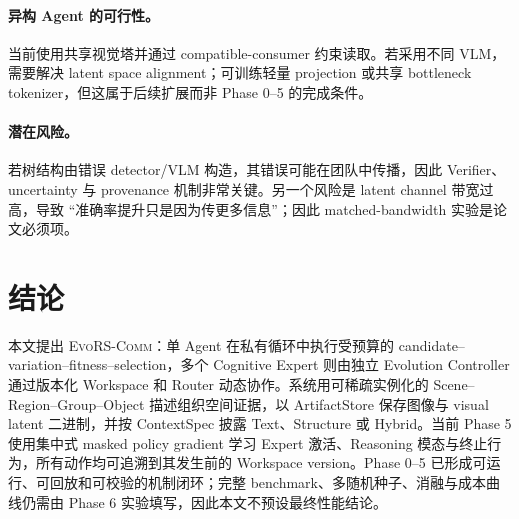 \documentclass[10pt,a4paper,twocolumn]{ctexart}
\newcommand{\ours}{\textsc{EvoRS-Comm}}
\begin{document}
\paragraph{异构 Agent 的可行性。}
当前使用共享视觉塔并通过 compatible-consumer 约束读取。若采用不同 VLM，需要解决 latent space alignment；可训练轻量 projection 或共享 bottleneck tokenizer，但这属于后续扩展而非 Phase 0--5 的完成条件。

\paragraph{潜在风险。}
若树结构由错误 detector/VLM 构造，其错误可能在团队中传播，因此 Verifier、uncertainty 与 provenance 机制非常关键。另一个风险是 latent channel 带宽过高，导致 ``准确率提升只是因为传更多信息''；因此 matched-bandwidth 实验是论文必须项。

\section{结论}
本文提出 \ours：单 Agent 在私有循环中执行受预算的 candidate--variation--fitness--selection，多个 Cognitive Expert 则由独立 Evolution Controller 通过版本化 Workspace 和 Router 动态协作。系统用可稀疏实例化的 Scene--Region--Group--Object 描述组织空间证据，以 ArtifactStore 保存图像与 visual latent 二进制，并按 ContextSpec 披露 Text、Structure 或 Hybrid。当前 Phase 5 使用集中式 masked policy gradient 学习 Expert 激活、Reasoning 模态与终止行为，所有动作均可追溯到其发生前的 Workspace version。Phase 0--5 已形成可运行、可回放和可校验的机制闭环；完整 benchmark、多随机种子、消融与成本曲线仍需由 Phase 6 实验填写，因此本文不预设最终性能结论。
\end{document}
